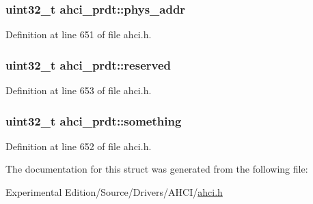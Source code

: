 \subsubsection[{\texorpdfstring{phys\+\_\+addr}{phys_addr}}]{\setlength{\rightskip}{0pt plus 5cm}uint32\+\_\+t ahci\+\_\+prdt\+::phys\+\_\+addr}\hypertarget{structahci__prdt_a9425b0f49c1db09325d54e3ac89f484c}{}\label{structahci__prdt_a9425b0f49c1db09325d54e3ac89f484c}


Definition at line 651 of file ahci.\+h.

\subsubsection[{\texorpdfstring{reserved}{reserved}}]{\setlength{\rightskip}{0pt plus 5cm}uint32\+\_\+t ahci\+\_\+prdt\+::reserved}\hypertarget{structahci__prdt_aa4716f5df6a9c798985643286a4260a4}{}\label{structahci__prdt_aa4716f5df6a9c798985643286a4260a4}


Definition at line 653 of file ahci.\+h.

\subsubsection[{\texorpdfstring{something}{something}}]{\setlength{\rightskip}{0pt plus 5cm}uint32\+\_\+t ahci\+\_\+prdt\+::something}\hypertarget{structahci__prdt_ad0746001774899f0a76d979e224ba575}{}\label{structahci__prdt_ad0746001774899f0a76d979e224ba575}


Definition at line 652 of file ahci.\+h.



The documentation for this struct was generated from the following file\+:\begin{DoxyCompactItemize}
\item 
Experimental Edition/\+Source/\+Drivers/\+A\+H\+C\+I/\hyperlink{ahci_8h}{ahci.\+h}\end{DoxyCompactItemize}
